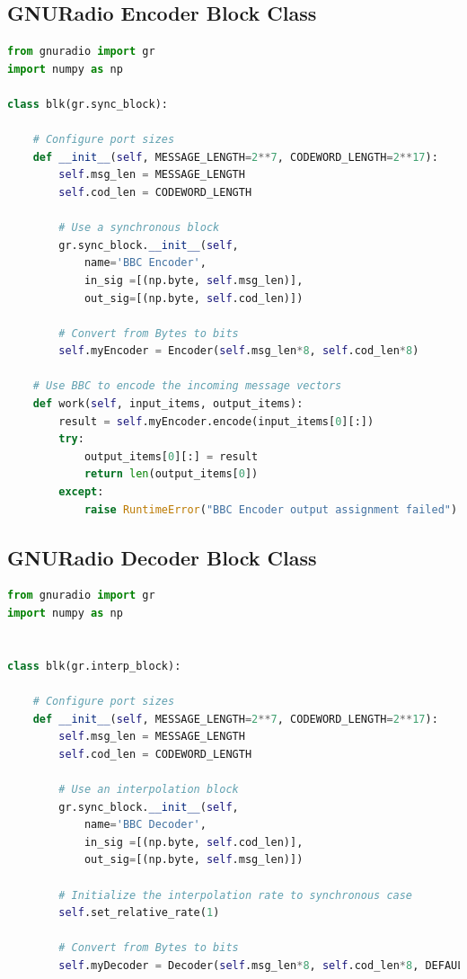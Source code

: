 \documentclass[conference]{IEEEtran}
\begin{document}
{\subsection{GNURadio Encoder Block Class}
\label{GnuEncodeAppendix}
\begin{lstlisting}[language=Python]
from gnuradio import gr
import numpy as np

class blk(gr.sync_block):

    # Configure port sizes
    def __init__(self, MESSAGE_LENGTH=2**7, CODEWORD_LENGTH=2**17):
        self.msg_len = MESSAGE_LENGTH
        self.cod_len = CODEWORD_LENGTH

        # Use a synchronous block
        gr.sync_block.__init__(self,
            name='BBC Encoder',
            in_sig =[(np.byte, self.msg_len)],    
            out_sig=[(np.byte, self.cod_len)])
        
        # Convert from Bytes to bits
        self.myEncoder = Encoder(self.msg_len*8, self.cod_len*8)
    
    # Use BBC to encode the incoming message vectors
    def work(self, input_items, output_items):
        result = self.myEncoder.encode(input_items[0][:])        
        try:
            output_items[0][:] = result
            return len(output_items[0])
        except:
            raise RuntimeError("BBC Encoder output assignment failed")
\end{lstlisting}

\newpage
\subsection{GNURadio Decoder Block Class}
\label{GnuDecodeAppendix}
\begin{lstlisting}[language=Python]
from gnuradio import gr
import numpy as np


class blk(gr.interp_block):

    # Configure port sizes
    def __init__(self, MESSAGE_LENGTH=2**7, CODEWORD_LENGTH=2**17):
        self.msg_len = MESSAGE_LENGTH
        self.cod_len = CODEWORD_LENGTH

        # Use an interpolation block
        gr.sync_block.__init__(self,
            name='BBC Decoder',
            in_sig =[(np.byte, self.cod_len)],    
            out_sig=[(np.byte, self.msg_len)])
            
        # Initialize the interpolation rate to synchronous case
        self.set_relative_rate(1)
        
        # Convert from Bytes to bits
        self.myDecoder = Decoder(self.msg_len*8, self.cod_len*8, DEFAULT_CHECKSUM)



\end{lstlisting}}
\end{document}
